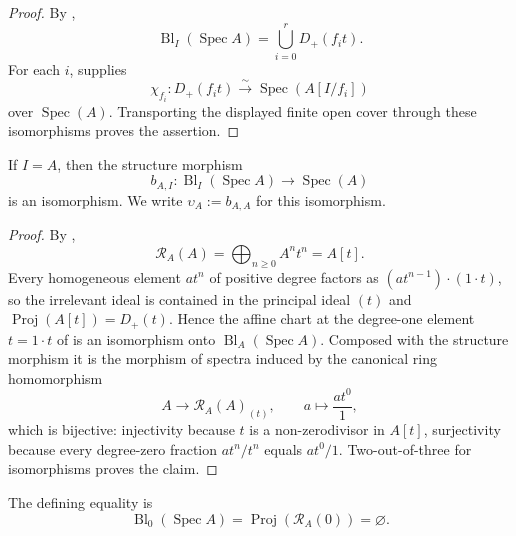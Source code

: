 \begin{proof}
  By ,
  \[
    \operatorname{Bl}_I(\operatorname{Spec}A)
      =\bigcup_{i=0}^rD_+(f_it).
  \]
  For each $i$,  supplies
  \[
    \chi_{f_i}\colon D_+(f_it)
      \xrightarrow{\sim}\operatorname{Spec}(A[I/f_i])
  \]
  over $\operatorname{Spec}(A)$.  Transporting the displayed finite open
  cover through these isomorphisms proves the assertion.
\end{proof}

\begin{lemma}
  \label{lemma:nagata-affine-blowup-top}
  \leanok

  If $I=A$, then the structure morphism
  \[
    b_{A,I}\colon
      \operatorname{Bl}_{I}(\operatorname{Spec}A)
      \longrightarrow\operatorname{Spec}(A)
  \]
  is an isomorphism.  We write
  $\upsilon_A:=b_{A,A}$ for this isomorphism.
\end{lemma}

\begin{proof}
  \leanok
  By ,
  \[
    \mathcal R_A(A)=\bigoplus_{n\ge0}A^nt^n=A[t].
  \]
  Every homogeneous element $at^n$ of positive degree factors as
  $(at^{n-1})\cdot(1\cdot t)$, so the irrelevant ideal is contained in the
  principal ideal $(t)$ and $\operatorname{Proj}(A[t])=D_+(t)$.  Hence the
  affine chart at the degree-one element $t=1\cdot t$ of
   is an isomorphism onto
  $\operatorname{Bl}_{A}(\operatorname{Spec}A)$.  Composed with the
  structure morphism it is the morphism of spectra induced by the canonical
  ring homomorphism
  \[
    A\longrightarrow \mathcal R_A(A)_{(t)},\qquad
    a\longmapsto \frac{at^0}{1},
  \]
  which is bijective: injectivity because $t$ is a non-zerodivisor in
  $A[t]$, surjectivity because every degree-zero fraction $at^n/t^n$ equals
  $at^0/1$.  Two-out-of-three for isomorphisms proves the claim.
\end{proof}

\begin{lemma}
  \label{lemma:nagata-affine-blowup-bot}
  \lean{}

  The defining equality is
  \[
    \operatorname{Bl}_{0}(\operatorname{Spec}A)
      =\operatorname{Proj}(\mathcal R_A(0))=\varnothing.           \tag{R0I0}
  \]
\end{lemma}

